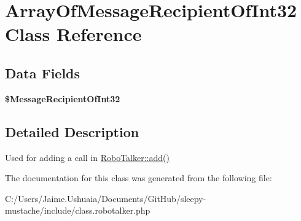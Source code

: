 \hypertarget{class_array_of_message_recipient_of_int32}{\section{Array\-Of\-Message\-Recipient\-Of\-Int32 Class Reference}
\label{class_array_of_message_recipient_of_int32}
}
\subsection*{Data Fields}
\begin{DoxyCompactItemize}
\item 
\hypertarget{class_array_of_message_recipient_of_int32_a6b5727823285f1bcb9ee8061f4fc6a49}{{\bfseries \$\-Message\-Recipient\-Of\-Int32}}\label{class_array_of_message_recipient_of_int32_a6b5727823285f1bcb9ee8061f4fc6a49}

\end{DoxyCompactItemize}


\subsection{Detailed Description}
Used for adding a call in \hyperlink{class_robo_talker_ac0650c287190d98e1d85ff9ef10a7404}{Robo\-Talker\-::add()} 

The documentation for this class was generated from the following file\-:\begin{DoxyCompactItemize}
\item 
C\-:/\-Users/\-Jaime.\-Ushuaia/\-Documents/\-Git\-Hub/sleepy-\/mustache/include/class.\-robotalker.\-php\end{DoxyCompactItemize}
